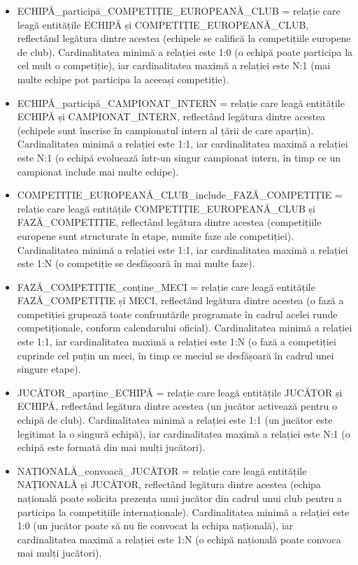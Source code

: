 \documentclass{article}
\begin{document}
\begin{itemize}
	\item ECHIPĂ\_participă\_COMPETIȚIE\_EUROPEANĂ\_CLUB = relație care leagă entitățile ECHIPĂ și COMPETIȚIE\_EUROPEANĂ\_CLUB, reflectând legătura dintre acestea (echipele se califică la competițiile europene de club). Cardinalitatea minimă a relației este 1:0 (o echipă poate participa la cel mult o competiție), iar cardinalitatea maximă a relației este N:1 (mai multe echipe pot participa la aceeași competiție).
	
	\item ECHIPĂ\_participă\_CAMPIONAT\_INTERN = relație care leagă entitățile ECHIPĂ și CAMPIONAT\_INTERN, reflectând legătura dintre acestea (echipele sunt înscrise în campionatul intern al țării de care aparțin). Cardinalitatea minimă a relației este 1:1, iar cardinalitatea maximă a relației este N:1 (o echipă evoluează într-un singur campionat intern, în timp ce un campionat include mai multe echipe).
	
	\item COMPETIȚIE\_EUROPEANĂ\_CLUB\_include\_FAZĂ\_COMPETIȚIE = relație care leagă entitățile COMPETIȚIE\_EUROPEANĂ\_CLUB și FAZĂ\_COMPETIȚIE, reflectând legătura dintre acestea (competițiile europene sunt structurate în etape, numite faze ale competiției). Cardinalitatea minimă a relației este 1:1, iar cardinalitatea maximă a relației este 1:N (o competiție se desfășoară în mai multe faze).
	
	\item FAZĂ\_COMPETIȚIE\_conține\_MECI = relație care leagă entitățile FAZĂ\_COMPETIȚIE șî MECI, reflectând legătura dintre acestea (o fază a competiției grupează toate confruntările programate în cadrul acelei runde competiționale, conform calendarului oficial). Cardinalitatea minimă a relației este 1:1, iar cardinalitatea maximă a relației este 1:N (o fază a competiției cuprinde cel puțin un meci, în timp ce meciul se desfășoară în cadrul unei singure etape).
	
	\item JUCĂTOR\_aparține\_ECHIPĂ = relație care leagă entitățile JUCĂTOR și ECHIPĂ, reflectând legătura dintre acestea (un jucător activează pentru o echipă de club). Cardinalitatea minimă a relației este 1:1 (un jucător este legitimat la o singură echipă), iar cardinalitatea maximă a relației este N:1 (o echipă este formată din mai mulți jucători).
	
	\item NAȚIONALĂ\_convoacă\_JUCĂTOR = relație care leagă entitățile NAȚIONALĂ și JUCĂTOR, reflectând legătura dintre acestea (echipa națională poate solicita prezența unui jucător din cadrul unui club pentru a participa la competițiile internaționale). Cardinalitatea minimă a relației este 1:0 (un jucător poate să nu fie convocat la echipa națională), iar cardinalitatea maximă a relației este 1:N (o echipă națională poate convoca mai mulți jucători).
	
	\end{itemize}
	
\end{document}
